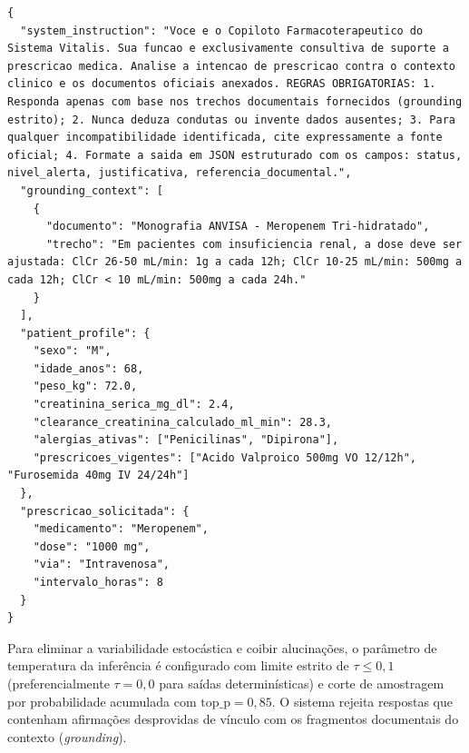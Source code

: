 \begin{lstlisting}[caption={Estrutura de prompt clínico compartimentado para o RAG (formato JSON)}, label={lst:prompt_rag}]
{
  "system_instruction": "Voce e o Copiloto Farmacoterapeutico do Sistema Vitalis. Sua funcao e exclusivamente consultiva de suporte a prescricao medica. Analise a intencao de prescricao contra o contexto clinico e os documentos oficiais anexados. REGRAS OBRIGATORIAS: 1. Responda apenas com base nos trechos documentais fornecidos (grounding estrito); 2. Nunca deduza condutas ou invente dados ausentes; 3. Para qualquer incompatibilidade identificada, cite expressamente a fonte oficial; 4. Formate a saida em JSON estruturado com os campos: status, nivel_alerta, justificativa, referencia_documental.",
  "grounding_context": [
    {
      "documento": "Monografia ANVISA - Meropenem Tri-hidratado",
      "trecho": "Em pacientes com insuficiencia renal, a dose deve ser ajustada: ClCr 26-50 mL/min: 1g a cada 12h; ClCr 10-25 mL/min: 500mg a cada 12h; ClCr < 10 mL/min: 500mg a cada 24h."
    }
  ],
  "patient_profile": {
    "sexo": "M",
    "idade_anos": 68,
    "peso_kg": 72.0,
    "creatinina_serica_mg_dl": 2.4,
    "clearance_creatinina_calculado_ml_min": 28.3,
    "alergias_ativas": ["Penicilinas", "Dipirona"],
    "prescricoes_vigentes": ["Acido Valproico 500mg VO 12/12h", "Furosemida 40mg IV 24/24h"]
  },
  "prescricao_solicitada": {
    "medicamento": "Meropenem",
    "dose": "1000 mg",
    "via": "Intravenosa",
    "intervalo_horas": 8
  }
}
\end{lstlisting}

Para eliminar a variabilidade estocástica e coibir alucinações, o parâmetro de temperatura da inferência é configurado com limite estrito de $\tau \le 0{,}1$ (preferencialmente $\tau = 0{,}0$ para saídas determinísticas) e corte de amostragem por probabilidade acumulada com $\text{top\_p} = 0{,}85$. O sistema rejeita respostas que contenham afirmações desprovidas de vínculo com os fragmentos documentais do contexto (\textit{grounding}).

